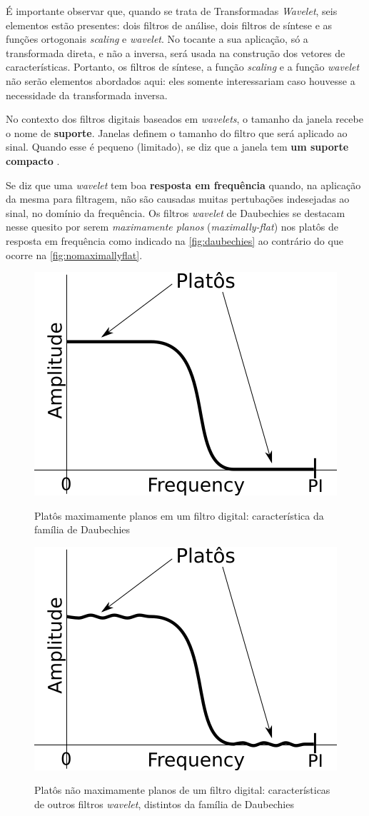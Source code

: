 			\par É importante observar que, quando se trata de Transformadas \textit{Wavelet}, seis elementos estão presentes: dois filtros de análise, dois filtros de síntese e as funções ortogonais \textit{scaling} e \textit{wavelet}. No tocante a sua aplicação, só a transformada direta, e não a inversa, será usada na construção dos vetores de características. Portanto, os filtros de síntese, a função \textit{scaling} e a função \textit{wavelet} não serão elementos abordados aqui: eles somente interessariam caso houvesse a necessidade da transformada inversa.
			
			\par No contexto dos filtros digitais baseados em \textit{wavelets}, o tamanho da janela recebe o nome de \textbf{suporte}. Janelas definem o tamanho do filtro que será aplicado ao sinal. Quando esse é pequeno (limitado), se diz que a janela tem \textbf{um suporte compacto} \cite{robi2003}.
			
			\par Se diz que uma \textit{wavelet} tem boa \textbf{resposta em frequência} quando, na aplicação da mesma para filtragem, não são causadas muitas pertubações indesejadas ao sinal, no domínio da frequência. Os filtros \textit{wavelet} de Daubechies \cite{daubechies1992ten} se destacam nesse quesito por serem \textit{maximamente planos} (\textit{maximally-flat}) \cite{butterworth1930} \cite{bianchi2007electronic} nos platôs de resposta em frequência como indicado na  \autoref{fig:daubechies} ao contrário do que ocorre na  \autoref{fig:nomaximallyflat}.
			
			\begin{figure}[h]
				\centering
				\caption[Platôs maximamente planos Daubechies]{Platôs maximamente planos em um filtro digital: característica da família de Daubechies}
				\includegraphics[width=0.3\linewidth]{images/daubechies}
				\label{fig:daubechies}
			\end{figure}
			
			\begin{figure}[h]
				\centering
				\caption[Platôs maximamente planos outros filtros]{Platôs não maximamente planos de um filtro digital: características de outros filtros \textit{wavelet}, distintos da família de Daubechies}
				\includegraphics[width=0.3\linewidth]{images/noMaximallyFlat}
				\label{fig:nomaximallyflat}
			\end{figure}
			
